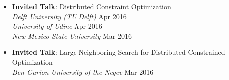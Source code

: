 \begin{itemize}
	\item {\bf Invited Talk}: Distributed Constraint Optimization\\
	{\em Delft University (TU Delft)} \hfill {Apr 2016}\\
 	{\em University of Udine} \hfill {Apr 2016} \\ 
	{\em New Mexico State University} \hfill {Mar 2016}
	
	\item {\bf Invited Talk}: Large Neighboring Search for Distributed Constrained Optimization\\
	{\em Ben-Gurion University of the Negev} \hfill {Mar 2016}
\end{itemize}
